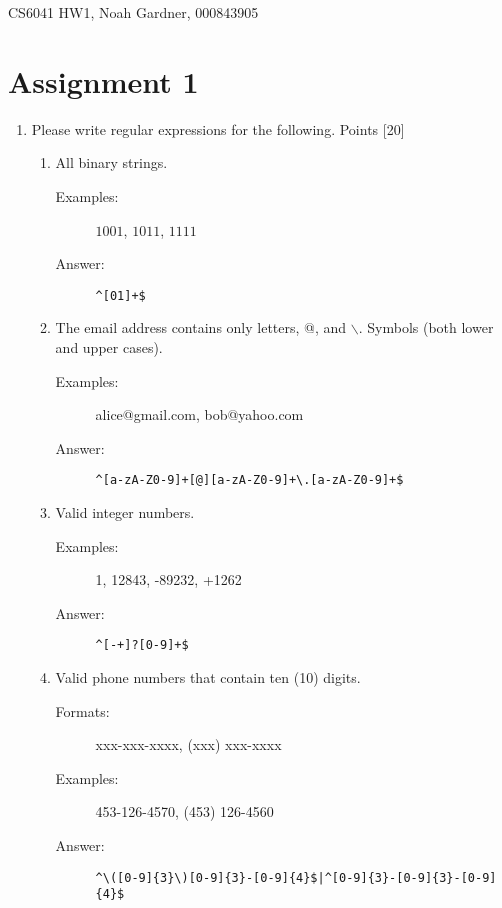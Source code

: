 \documentclass[12pt]{article}
\begin{document}
CS6041 HW1, Noah Gardner, 000843905\newline

\section{Assignment 1}

\begin{enumerate}
    \item Please write regular expressions for the following. Points [20]
          \begin{enumerate}
              \item All binary strings.
                    \begin{description}
                        \item[Examples:] $1001$, $1011$, $1111$
                        \item[Answer: ] \verb/^[01]+$/
                    \end{description}
              \item The email address contains only letters, @, and
                    $\backslash$. Symbols (both lower and upper cases).
                    \begin{description}
                        \item[Examples:] alice@gmail.com, bob@yahoo.com
                        \item[Answer: ]
                            \verb/^[a-zA-Z0-9]+[@][a-zA-Z0-9]+\.[a-zA-Z0-9]+$/
                    \end{description}
              \item Valid integer numbers.
                    \begin{description}
                        \item[Examples:] 1, 12843, -89232, +1262
                        \item[Answer: ] \verb/^[-+]?[0-9]+$/
                    \end{description}
              \item Valid phone numbers that contain ten (10) digits.
                    \begin{description}
                        \item[Formats:] xxx-xxx-xxxx, (xxx) xxx-xxxx
                        \item[Examples:] 453-126-4570, (453) 126-4560
                        \item[Answer: ]
                            \verb/^\([0-9]{3}\)[0-9]{3}-[0-9]{4}$|^[0-9]{3}-[0-9]{3}-[0-9]{4}$/
                    \end{description}
          \end{enumerate}


\end{enumerate}
\end{document}
